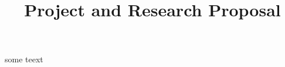 \documentclass[10pt,a4paper,twocolumn]{report}
\title{Project and Research Proposal}
\begin{document}
some teext
\end{document}
